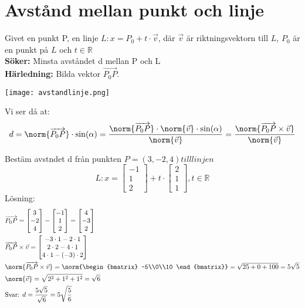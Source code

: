 \section{Avstånd mellan punkt och linje} %
\label{sec:avst_nd_mellan_punkt_och_linje}
Givet en punkt P, en linje $L:x = P_0 + t \cdot \vec{v}$, där $\vec{v}$ är riktningsvektorn till $L$, $P_0$ är en punkt på $L$ och $t \in \mathbb{R}$\\
\textbf{Söker:} Minsta avståndet d mellan P och L\\
\textbf{Härledning:} Bilda vektor $\overrightarrow{P_0P}$. 
\begin{center}
	\texttt{[image: avstandlinje.png]}
\end{center}
Vi ser då at:
\[
    d = \norm{\overrightarrow{P_0P}} \cdot \sin(\alpha) = \frac{\norm{\overrightarrow{P_0P}} \cdot \norm{\vec{v}} \cdot \sin(\alpha)}{\norm{\vec{v}}} = \frac{\norm{\overrightarrow{P_0P} \times \vec{v}}}{\norm{\vec{v}}}
\]
\begin{Ex}
    Bestäm avstndet d från punkten $P=(3,-2,4) till linjen$
    \[
        L:x = \begin{bmatrix} -1\\1\\2 \end{bmatrix} + t \cdot \begin{bmatrix} 2\\1\\1 \end{bmatrix}, t \in \mathbb{R}
    \]
    Lösning:
    \begin{align*}
    	&\overrightarrow{P_0P} = \begin{bmatrix} 3\\-2\\4 \end{bmatrix} - \begin{bmatrix} -1\\1\\2 \end{bmatrix} = \begin{bmatrix} 4\\-3\\2 \end{bmatrix}\\
    	&\overrightarrow{P_0P} \times \vec{v} = \begin{bmatrix} -3 \cdot 1 - 2 \cdot 1\\2 \cdot 2 - 4 \cdot 1\\4 \cdot 1 - (-3) \cdot 2 \end{bmatrix}\\
    	&\norm{\overrightarrow{P_0P} \times \vec{v}} = \norm{\begin{bmatrix} -5\\0\\10 \end{bmatrix}} = \sqrt{25+0+100} = 5 \sqrt{5}\\
    	&\norm{\vec{v}} = \sqrt{2^2+1^2+1^2} = \sqrt{6}\\
    	&\mbox{Svar: } d = \frac{5\sqrt{5}}{\sqrt{6}} = 5 \sqrt{\frac{5}{6}}
    \end{align*}
\end{Ex}

